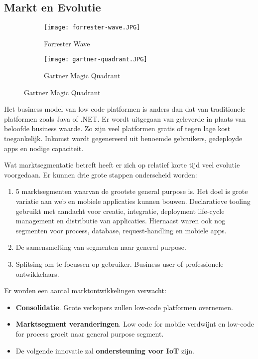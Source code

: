 \subsection{Markt en Evolutie}
\label{sec:markt-en-evolutie}

\begin{figure}[h!]
    \centering
    \begin{subfigure}[b]{0.4\linewidth}
        \texttt{[image: forrester-wave.JPG]}
        \caption{Forrester Wave \autocite{Rymer2019}}
    \end{subfigure}
    \begin{subfigure}[b]{0.4\linewidth}
        \texttt{[image: gartner-quadrant.JPG]}
        \caption{Gartner Magic Quadrant \autocite{Vincent2019}}
    \end{subfigure}
    \label{fig:quadwave}
\end{figure}

Het business model van low code platformen is anders dan dat van traditionele platformen zoals Java of .NET. Er wordt uitgegaan van geleverde in plaats van beloofde business waarde. Zo zijn veel platformen gratis of tegen lage kost toegankelijk. Inkomst wordt gegenereerd uit benoemde gebruikers, gedeployde apps en nodige capaciteit. \autocite{Richardson2016}

Wat marktsegmentatie betreft heeft er zich op relatief korte tijd veel evolutie voorgedaan. Er kunnen drie grote stappen onderscheid worden:
\begin{enumerate}
    \item 5 marktsegmenten waarvan de grootste general purpose is. Het doel is grote variatie aan web en mobiele applicaties kunnen bouwen. Declaratieve tooling gebruikt met aandacht voor creatie, integratie, deployment life-cycle management en distributie van applicaties. Hiernaast waren ook nog segmenten voor process, database, request-handling en mobiele apps.
    \item De samensmelting van segmenten naar general purpose. %
    \item Splitsing om te focussen op gebruiker. Business user of professionele ontwikkelaars. %
\end{enumerate}

Er worden een aantal marktontwikkelingen verwacht:
\begin{itemize}
    \item \textbf{Consolidatie}. Grote verkopers zullen low-code platformen overnemen.
    \item \textbf{Marktsegment veranderingen}. Low code for mobile verdwijnt en low-code for process groeit naar general purpose segment.
    \item De volgende innovatie zal \textbf{ondersteuning voor IoT} zijn.
\end{itemize} \autocite{Richardson2016}


